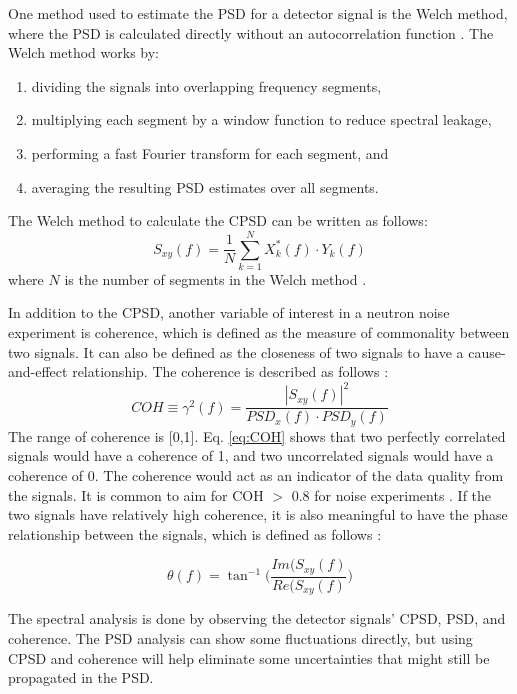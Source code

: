 One method used to estimate the PSD for a detector signal is the Welch method, where the PSD is calculated directly without an autocorrelation function \cite{welchDirectDigitalMethod1961}. The Welch method works by:
\begin{enumerate}
    \item dividing the signals into overlapping frequency segments,
    \item multiplying each segment by a window function to reduce spectral leakage,
    \item performing a fast Fourier transform for each segment, and 
    \item averaging the resulting PSD estimates over all segments. 
\end{enumerate}
The Welch method to calculate the CPSD can be written as follows:
\begin{equation}
    S_{xy}(f) = \frac{1}{N} \sum_{k=1}^{N} X_k^*(f) \cdot Y_k(f)
\end{equation}
where $N$ is the number of segments in the Welch method \cite{ambrozicNoiseAnalysisTechniques2020}.

In addition to the CPSD, another variable of interest in a neutron noise experiment is coherence, which is defined as the measure of commonality between two signals. It can also be defined as the closeness of two signals to have a cause-and-effect relationship. The coherence is described as follows \cite{fryAnalysisNeutrondensityOscillations1975}:
\begin{equation}
    COH \equiv \gamma^2 (f) = \frac{|S_{xy} (f)|^2}{PSD_x (f) \cdot PSD_y (f)}
    \label{eq:COH}
\end{equation}
The range of coherence is [0,1]. Eq. \ref{eq:COH} shows that two perfectly correlated signals would have a coherence of 1, and two uncorrelated signals would have a coherence of 0. The coherence would act as an indicator of the data quality from the signals. It is common to aim for COH $>$ 0.8 for noise experiments \cite{ambrozicNoiseAnalysisTechniques2020}. If the two signals have relatively high coherence, it is also meaningful to have the phase relationship between the signals, which is defined as follows \cite{fryAnalysisNeutrondensityOscillations1975}:

\begin{equation}
    \theta (f) = \tan^{-1} \biggl( \frac{Im(S_{xy} (f)}{Re(S_{xy} (f)} \biggr)
\end{equation}

The spectral analysis is done by observing the detector signals’ CPSD, PSD, and coherence. The PSD analysis can show some fluctuations directly, but using CPSD and coherence will help eliminate some uncertainties that might still be propagated in the PSD.

